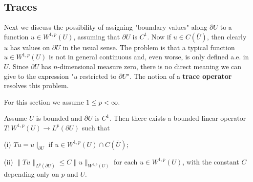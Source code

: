 \subsection{Traces}
Next we discuss the possibility of assigning "boundary values" along $\partial U$ to a function $u\in W^{1,p}(U)$, assuming that $\partial U$ is $C^1$. Now if $u\in C(\overline{U})$, then clearly $u$ has values on $\partial U$ in the usual sense. The problem is that a typical function $u\in W^{1,p}(U)$ is not in general continuous and, even worse, is only defined a.e. in $U$. Since $\partial U$ has $n$-dimensional measure zero, there is no direct meaning we can give to the expression "$u$ restricted to $\partial U$". The notion of a \textbf{trace operator} resolves this problem.\par
For this section we assume $1\le p<\infty$.
\begin{theorem}
Assume $U$ is bounded and $\partial U$ is $C^1$. Then there exists a bounded linear operator $T:W^{1,p}(U)\to L^p(\partial U)$ such that \par
(i) $Tu=u\mid_{\partial U}$ if $u\in W^{1,p}(U)\cap C(\overline{U})$;\par
(ii) $\|Tu\|_{L^p(\partial U)}\le C\|u\|_{W^{1,p}(U)}$ for each $u\in W^{1,p}(U)$, with the constant $C$ depending only on $p$ and $U$.
\end{theorem}
